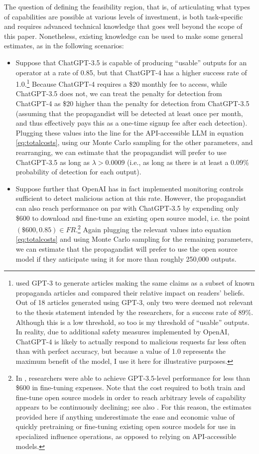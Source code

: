 \documentclass{article}
\begin{document}
The question of defining the feasibility region, that is, of articulating what types of capabilities are possible at various levels of investment, is both task-specific and requires advanced technical knowledge that goes well beyond the scope of this paper. Nonetheless, existing knowledge can be used to make some general estimates, as in the following scenarios:

\begin{itemize}
  \item Suppose that ChatGPT-3.5 is capable of producing ``usable'' outputs for an operator at a rate of 0.85, but that ChatGPT-4 has a higher success rate of 1.0.\footnote{\cite{surveyresearch} used GPT-3 to generate articles making the same claims as a subset of known propaganda articles and compared their relative impact on readers' beliefs. Out of 18 articles generated using GPT-3, only two were deemed not relevant to the thesis statement intended by the researchers, for a success rate of 89\%. Although this is a low threshold, so too is my threshold of ``usable'' outputs. In reality, due to additional safety measures implemented by OpenAI, ChatGPT-4 is likely to actually respond to malicious requests far less often than with perfect accuracy, but because a value of 1.0 represents the maximum benefit of the model, I use it here for illustrative purposes.} Because ChatGPT-4 requires a \$20 monthly fee to access, while ChatGPT-3.5 does not, we can treat the penalty for detection from ChatGPT-4 as \$20 higher than the penalty for detection from ChatGPT-3.5 (assuming that the propagandist will be detected at least once per month, and thus effectively pays this as a one-time signup fee after each detection). Plugging these values into the line for the API-accessible LLM in equation \ref{eq:totalcosts}, using our Monte Carlo sampling for the other parameters, and rearranging, we can estimate that the propagandist will prefer to use ChatGPT-3.5 as long as $\lambda > 0.0009$ (i.e., as long as there is at least a 0.09\% probability of detection for each output). 
  \item Suppose further that OpenAI has in fact implemented monitoring controls sufficient to detect malicious action at this rate. However, the propagandist can also reach performance on par with ChatGPT-3.5 by expending only \$600 to download and fine-tune an existing open source model, i.e. the point $(\$600, 0.85) \in FR$.\footnote{In \cite{alpaca}, researchers were able to achieve GPT-3.5-level performance for less than \$600 in fine-tuning expenses. Note that the cost required to both train and fine-tune open source models in order to reach arbitrary levels of capability appears to be continuously declining; see also \cite{mosaic}. For this reason, the estimates provided here if anything underestimate the ease and economic value of quickly pretraining or fine-tuning existing open source models for use in specialized influence operations, as opposed to relying on API-accessible models.} Again plugging the relevant values into equation \ref{eq:totalcosts} and using Monte Carlo sampling for the remaining parameters, we can estimate that the propagandist will prefer to use the open source model if they anticipate using it for more than roughly 250,000 outputs. 

\end{itemize}
\end{document}

